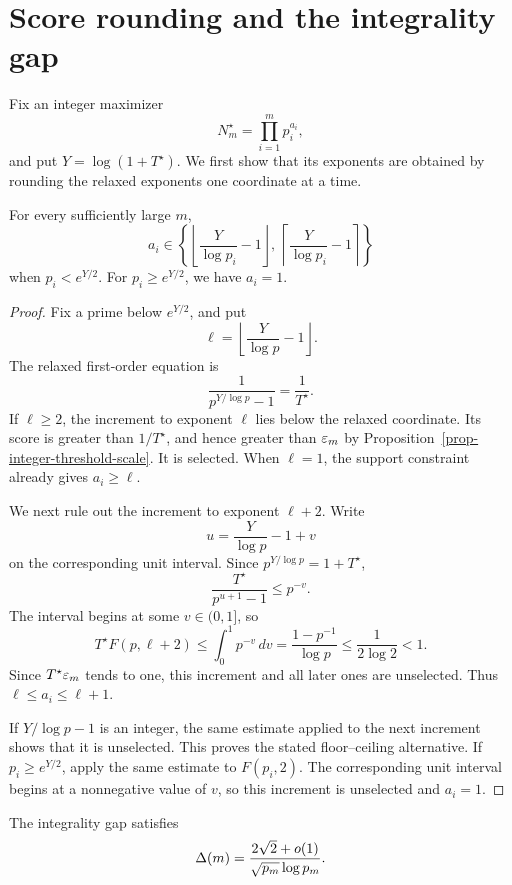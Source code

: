 \section{Score rounding and the integrality gap}
\label{s-integrality-gap}

Fix an integer maximizer
\[
    N_m^\star=\prod_{i=1}^{m}p_i^{a_i},
\]
and put \(Y=\log(1+T^\star)\). We first show that its exponents are
obtained by rounding the relaxed exponents one coordinate at a time.

\begin{proposition}
\label{prop-floor-ceiling}
For every sufficiently large \(m\),
\[
    a_i
    \in
    \left\{
        \left\lfloor\frac{Y}{\log p_i}-1\right\rfloor,\,
        \left\lceil\frac{Y}{\log p_i}-1\right\rceil
    \right\}
\]
when \(p_i<e^{Y/2}\). For \(p_i\geq e^{Y/2}\), we have \(a_i=1\).
\end{proposition}

\begin{proof}
Fix a prime below \(e^{Y/2}\), and put
\[
    \ell=\left\lfloor\frac{Y}{\log p}-1\right\rfloor.
\]
The relaxed first-order equation is
\[
    \frac1{p^{Y/\log p}-1}=\frac1{T^\star}.
\]
If \(\ell\geq2\), the increment to exponent \(\ell\) lies below the
relaxed coordinate. Its score is greater than \(1/T^\star\), and hence greater than
\(\varepsilon_m\) by Proposition~\ref{prop-integer-threshold-scale}. It is
selected. When \(\ell=1\), the support constraint already gives
\(a_i\geq\ell\).

We next rule out the increment to exponent \(\ell+2\). Write
\[
    u=\frac{Y}{\log p}-1+v
\]
on the corresponding unit interval. Since \(p^{Y/\log p}=1+T^\star\),
\[
    \frac{T^\star}{p^{u+1}-1}
    \leq p^{-v}.
\]
The interval begins at some \(v\in(0,1]\), so
\[
    T^\star F(p,\ell+2)
    \leq
    \int_0^1p^{-v}\,dv
    =
    \frac{1-p^{-1}}{\log p}
    \leq
    \frac1{2\log2}
    <1.
\]
Since \(T^\star\varepsilon_m\) tends to one, this increment and all later ones
are unselected. Thus \(\ell\leq a_i\leq\ell+1\).

If \(Y/\log p-1\) is an integer, the same estimate applied to the next
increment shows that it is unselected. This proves the stated
floor--ceiling alternative. If \(p_i\geq e^{Y/2}\), apply the same
estimate to \(F(p_i,2)\). The corresponding unit interval begins at a
nonnegative value of \(v\), so this increment is unselected and
\(a_i=1\).
\end{proof}

\begin{theorem}
\label{thm-integrality-gap}
The integrality gap satisfies
\[
    \Delta(m)
    =
    \frac{2\sqrt2+o(1)}
         {\sqrt{p_m}\log p_m}.
\]
\end{theorem}

